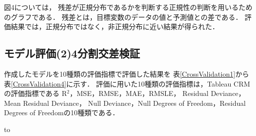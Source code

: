 \documentclass[submit,techrep,noauthor]{ipsj}
\begin{document}
\newpage
図4については，
残差が正規分布であるかを判断する正規性の判断を用いるためのグラフである．
残差とは，目標変数のデータの値と予測値との差である．
評価結果では，正規分布ではなく，非正規分布に近い結果が得られた．


\vspace{-2mm}
\subsection{モデル評価(2)4分割交差検証}\label{evaluation3}
作成したモデルを10種類の評価指標で評価した結果を
表\ref{CrossValidation1}から表\ref{CrossValidation4}に示す．
評価に用いた10種類の評価指標は，Tableau CRMの評価指標である
R$^2$，MSE，RMSE，MAE，RMSLE，
Residual Deviance，Mean Residual Deviance，
Null Deviance，Null Degrees of Freedom，Residual Degrees of Freedomの10種類である．
\vspace{-2mm}

\begin{table}[h] 
\caption{GLMモデルの評価(交差検証 - 誤差)} 
\label{CrossValidation1}
\hbox to
\end{table}
\vspace{-2mm}
\end{document}
